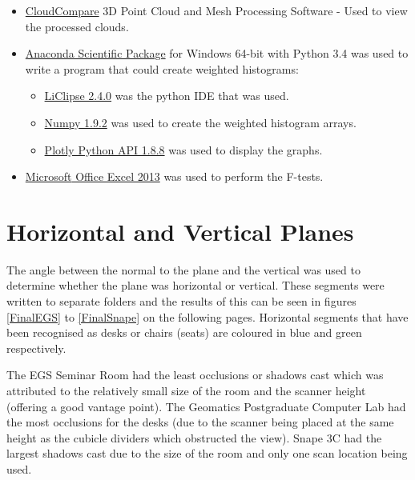 \begin{itemize}
	\item \href{http://www.danielgm.net/cc/}{CloudCompare} 3D Point Cloud and Mesh Processing Software - Used to view the processed clouds.
	\item \href{https://www.continuum.io/downloads}{Anaconda Scientific Package} for Windows 64-bit with Python 3.4 was used to write a program that could create weighted histograms:
	\begin{itemize}
		\item \href{http://www.liclipse.com/}{LiClipse 2.4.0} was the python IDE that was used.
		\item \href{http://www.numpy.org/}{Numpy 1.9.2} was used to create the weighted histogram arrays.
		\item \href{https://plot.ly/python/}{Plotly Python API 1.8.8} was used to display the graphs.
	\end{itemize}
	\item \href{www.microsoftstore.com}{Microsoft\textsuperscript{\textregistered} Office Excel 2013} was used to perform the F-tests. 
\end{itemize}

\section{Horizontal and Vertical Planes}
The angle between the normal to the plane and the vertical was used to determine whether the plane was horizontal or vertical. These segments were written to separate folders and the results of this can be seen in figures \ref{FinalEGS} to \ref{FinalSnape} on the following pages. Horizontal segments that have been recognised as desks or chairs (seats) are coloured in blue and green respectively. 

The EGS Seminar Room had the least occlusions or shadows cast which was attributed to the relatively small size of the room and the scanner height (offering a good vantage point). The Geomatics Postgraduate Computer Lab had the most occlusions for the desks (due to the scanner being placed at the same height as the cubicle dividers which obstructed the view). Snape 3C had the largest shadows cast due to the size of the room and only one scan location being used. 

